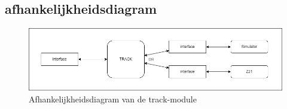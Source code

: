 \documentclass[a4paper, 11pt]{article}
\newcommand{\<}{\scriptsize\textless\normalsize}
\renewcommand{\>}{\scriptsize\textgreater\normalsize}
\begin{document}
\subsection{afhankelijkheidsdiagram} %
\begin{figure}[h]
	\begin{center}
		\includegraphics[scale=.5]{Afhankelijkheidsdiagrammen/track.png}
		\caption{Afhankelijkheidsdiagram van de track-module}
	\end{center}
\end{figure}

\end{document}
